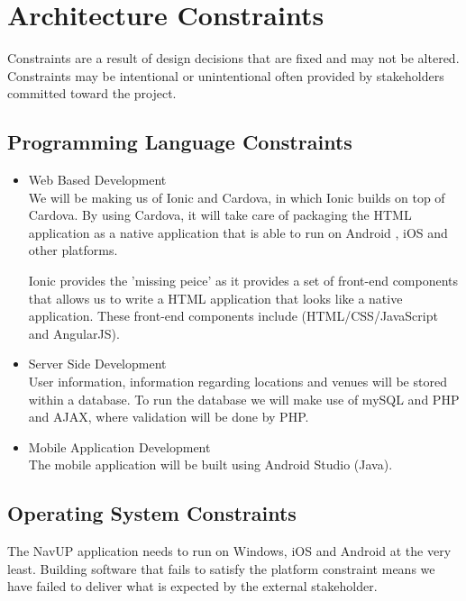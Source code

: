\documentclass{article}
\begin{document}
	\section{Architecture Constraints}
	Constraints are a result of design decisions that are fixed and may not be altered. Constraints may be intentional or unintentional often provided by stakeholders committed toward the project.
		
		\subsection{Programming Language Constraints}
			\begin{itemize}
 				\item Web Based Development
 				\bigskip
 				\\ 				
 				We will be making us of Ionic and Cardova, in which Ionic builds on top of Cardova. By using Cardova, it will take care of packaging the HTML application as a native application that is able to run on Android , iOS and other platforms.
				
				Ionic provides the 'missing peice' as it provides a set of front-end components that allows us to write a HTML application that looks like a native application. These front-end components include (HTML/CSS/JavaScript and AngularJS).
 				
  				\item Server Side Development
  				\bigskip
				\\
 				User information, information regarding locations and venues will be stored within a database. To run the database we will make use of mySQL and PHP and AJAX, where validation will be done by PHP.
 				
 				\item Mobile Application  Development
  				\bigskip
 				\\
 				The mobile application will be built using Android Studio (Java).
 							
			\end{itemize}


		\subsection{Operating System Constraints}			   
 				The NavUP application needs to run on Windows, iOS and Android at the very least. Building software that fails to satisfy the platform constraint means we have failed to deliver what is expected by the external stakeholder. 
 				
\end{document}
